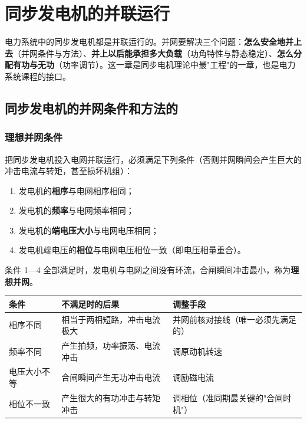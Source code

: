 \chapter{同步发电机的并联运行}

电力系统中的同步发电机都是并联运行的。并网要解决三个问题：\textbf{怎么安全地并上去}（并网条件与方法）、\textbf{并上以后能承担多大负载}（功角特性与静态稳定）、\textbf{怎么分配有功与无功}（功率调节）。这一章是同步电机理论中最"工程"的一章，也是电力系统课程的接口。

\section{同步发电机的并网条件和方法的}

\subsection{理想并网条件}
把同步发电机投入电网并联运行，必须满足下列条件（否则并网瞬间会产生巨大的冲击电流与转矩，甚至损坏机组）：
\begin{enumerate}
  \item 发电机的\textbf{相序}与电网相序相同；
  \item 发电机的\textbf{频率}与电网频率相同；
  \item 发电机的\textbf{端电压大小}与电网电压相同；
  \item 发电机端电压的\textbf{相位}与电网电压相位一致（即电压相量重合）。
\end{enumerate}
条件 1—4 全部满足时，发电机与电网之间没有环流，合闸瞬间冲击最小，称为\textbf{理想并网}。

\begin{center}
\begin{tabular}{@{}p{2.2cm}p{4.4cm}p{5.2cm}@{}}
\toprule
条件 & 不满足时的后果 & 调整手段 \\
\midrule
相序不同 & 相当于两相短路，冲击电流极大 & 并网前核对接线（唯一必须先满足的） \\
频率不同 & 产生拍频，功率振荡、电流冲击 & 调原动机转速 \\
电压大小不等 & 合闸瞬间产生无功冲击电流 & 调励磁电流 \\
相位不一致 & 产生很大的有功冲击与转矩冲击 & 调相位（准同期最关键的"合闸时机"） \\
\bottomrule
\end{tabular}
\end{center}

